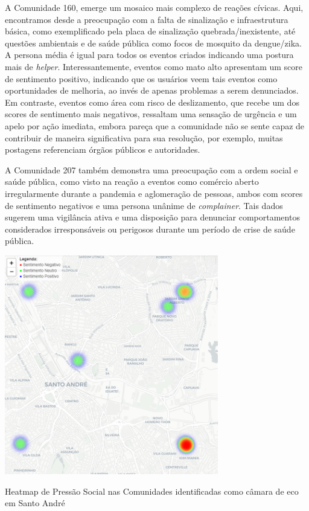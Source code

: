 A Comunidade 160, emerge um mosaico mais complexo de reações cívicas. Aqui, encontramos desde a preocupação com a falta de sinalização e infraestrutura básica, como exemplificado pela placa de sinalização quebrada/inexistente, até questões ambientais e de saúde pública como focos de mosquito da dengue/zika. A persona média é igual para todos os eventos criados indicando uma postura mais de \textit{helper}. Interessantemente, eventos como mato alto apresentam um score de sentimento positivo, indicando que os usuários veem tais eventos como oportunidades de melhoria, ao invés de apenas problemas a serem denunciados. Em contraste, eventos como área com risco de deslizamento, que recebe um dos scores de sentimento mais negativos, ressaltam uma sensação de urgência e um apelo por ação imediata, embora pareça que a comunidade não se sente capaz de contribuir de maneira significativa para sua resolução, por exemplo, muitas postagens referenciam órgãos públicos e autoridades.

A Comunidade 207 também demonstra uma preocupação com a ordem social e saúde pública, como visto na reação a eventos como comércio aberto irregularmente durante a pandemia e aglomeração de pessoas, ambos com scores de sentimento negativos e uma persona unânime de \textit{complainer}. Tais dados sugerem uma vigilância ativa e uma disposição para denunciar comportamentos considerados irresponsáveis ou perigosos durante um período de crise de saúde pública.

\begin{quadro}[htb]
	\centering
	\includegraphics[width=0.7\textwidth]{images/echo_chamber_santo_andre_heatmap.PNG}
	\caption{Heatmap de Pressão Social nas Comunidades identificadas como câmara de eco em Santo André}
	\label{fig:echo_chamber_santo_andre_heatmap}
\end{quadro}

